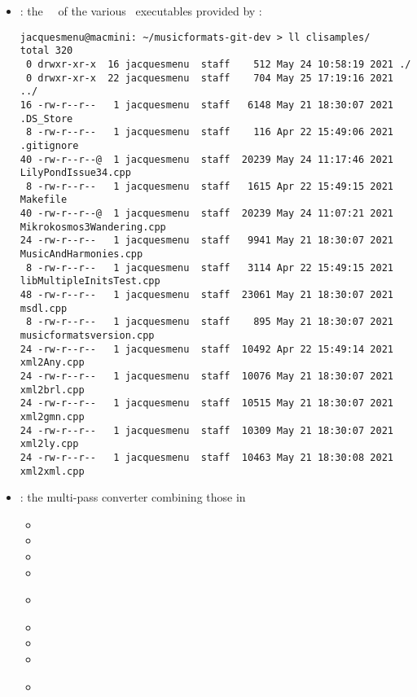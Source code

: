 \begin{itemize}

\item {} : the \mainFunction\ \functions\ of the various \CLI\ executables provided by \mf: %
\begin{lstlisting}[language=Terminal]
jacquesmenu@macmini: ~/musicformats-git-dev > ll clisamples/
total 320
 0 drwxr-xr-x  16 jacquesmenu  staff    512 May 24 10:58:19 2021 ./
 0 drwxr-xr-x  22 jacquesmenu  staff    704 May 25 17:19:16 2021 ../
16 -rw-r--r--   1 jacquesmenu  staff   6148 May 21 18:30:07 2021 .DS_Store
 8 -rw-r--r--   1 jacquesmenu  staff    116 Apr 22 15:49:06 2021 .gitignore
40 -rw-r--r--@  1 jacquesmenu  staff  20239 May 24 11:17:46 2021 LilyPondIssue34.cpp
 8 -rw-r--r--   1 jacquesmenu  staff   1615 Apr 22 15:49:15 2021 Makefile
40 -rw-r--r--@  1 jacquesmenu  staff  20239 May 24 11:07:21 2021 Mikrokosmos3Wandering.cpp
24 -rw-r--r--   1 jacquesmenu  staff   9941 May 21 18:30:07 2021 MusicAndHarmonies.cpp
 8 -rw-r--r--   1 jacquesmenu  staff   3114 Apr 22 15:49:15 2021 libMultipleInitsTest.cpp
48 -rw-r--r--   1 jacquesmenu  staff  23061 May 21 18:30:07 2021 msdl.cpp
 8 -rw-r--r--   1 jacquesmenu  staff    895 May 21 18:30:07 2021 musicformatsversion.cpp
24 -rw-r--r--   1 jacquesmenu  staff  10492 Apr 22 15:49:14 2021 xml2Any.cpp
24 -rw-r--r--   1 jacquesmenu  staff  10076 May 21 18:30:07 2021 xml2brl.cpp
24 -rw-r--r--   1 jacquesmenu  staff  10515 May 21 18:30:07 2021 xml2gmn.cpp
24 -rw-r--r--   1 jacquesmenu  staff  10309 May 21 18:30:07 2021 xml2ly.cpp
24 -rw-r--r--   1 jacquesmenu  staff  10463 May 21 18:30:08 2021 xml2xml.cpp
\end{lstlisting}

\item {} : the multi-pass converter combining those in 

\begin{itemize}
  \item {}
  \item {}
  \item {}
  \item {}
  \item {}\\[-0.5ex]

  \item {}
  \item {}
  \item {}
  \item {}\\[-0.5ex]


\end{itemize}
\end{itemize}
